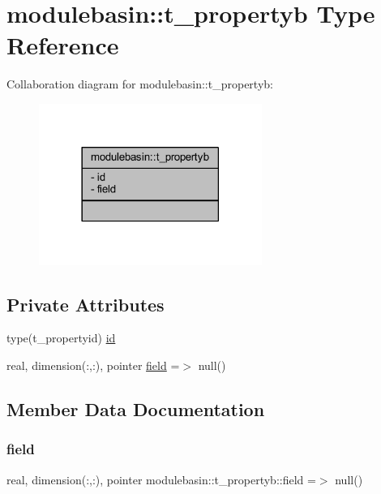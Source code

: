 \hypertarget{structmodulebasin_1_1t__propertyb}{}\section{modulebasin\+:\+:t\+\_\+propertyb Type Reference}
\label{structmodulebasin_1_1t__propertyb}


Collaboration diagram for modulebasin\+:\+:t\+\_\+propertyb\+:\nopagebreak
\begin{figure}[H]
\begin{center}
\leavevmode
\includegraphics[width=206pt]{structmodulebasin_1_1t__propertyb__coll__graph}
\end{center}
\end{figure}
\subsection*{Private Attributes}
\begin{DoxyCompactItemize}
\item 
type(t\+\_\+propertyid) \mbox{\hyperlink{structmodulebasin_1_1t__propertyb_a25a924d518be1886ca93cef044db2ab7}{id}}
\item 
real, dimension(\+:,\+:), pointer \mbox{\hyperlink{structmodulebasin_1_1t__propertyb_aea5496e601c9265cda505ebf13ecbde5}{field}} =$>$ null()
\end{DoxyCompactItemize}


\subsection{Member Data Documentation}
\mbox{\label{structmodulebasin_1_1t__propertyb_aea5496e601c9265cda505ebf13ecbde5}} 
\subsubsection{\texorpdfstring{field}{field}}
{\footnotesize\ttfamily real, dimension(\+:,\+:), pointer modulebasin\+::t\+\_\+propertyb\+::field =$>$ null()\hspace{0.3cm}{\ttfamily [private]}}

